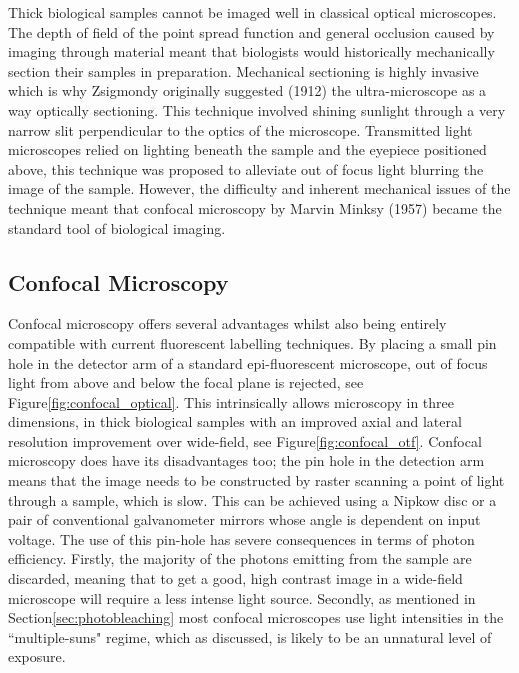Thick biological samples cannot be imaged well in classical optical microscopes.
The depth of field of the point spread function and general occlusion caused by imaging through material meant that biologists would historically mechanically section their samples in preparation.
Mechanical sectioning is highly invasive which is why Zsigmondy originally suggested (1912) the ultra-microscope as a way optically sectioning\cite{Mappes2012}.
This technique involved shining sunlight through a very narrow slit perpendicular to the optics of the microscope.
Transmitted light microscopes relied on lighting beneath the sample and the eyepiece positioned above, this technique was proposed to alleviate out of focus light blurring the image of the sample.
However, the difficulty and inherent mechanical issues of the technique meant that confocal microscopy by Marvin Minksy (1957)\cite{Minsky1957} became the standard tool of biological imaging.

\subsection{Confocal Microscopy}

Confocal microscopy offers several advantages whilst also being entirely compatible with current fluorescent labelling techniques.
By placing a small pin hole in the detector arm of a standard epi-fluorescent microscope, out of focus light from above and below the focal plane is rejected\cite{Minsky1957}, see Figure\ref{fig:confocal_optical}.
This intrinsically allows microscopy in three dimensions, in thick biological samples with an improved axial and lateral resolution improvement over wide-field\cite{Claxton2006}, see Figure\ref{fig:confocal_otf}.
Confocal microscopy does have its disadvantages too; the pin hole in the detection arm means that the image needs to be constructed by raster scanning a point of light through a sample, which is slow.
This can be achieved using a Nipkow disc or a pair of conventional galvanometer mirrors whose angle is dependent on input voltage.
The use of this pin-hole has severe consequences in terms of photon efficiency.
Firstly, the majority of the photons emitting from the sample are discarded, meaning that to get a good, high contrast image in a wide-field microscope will require a less intense light source.
Secondly, as mentioned in Section\ref{sec:photobleaching} most confocal microscopes use light intensities in the ``multiple-suns" regime\cite{Stelzer2015}, which as discussed, is likely to be an unnatural level of exposure.

